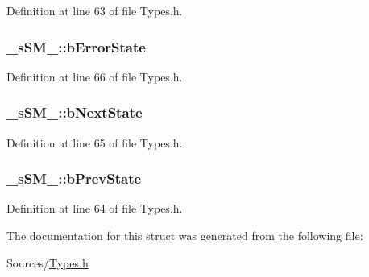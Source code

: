 Definition at line 63 of file Types.\+h.

\subsubsection[{\texorpdfstring{b\+Error\+State}{bErrorState}}]{ \+\_\+s\+S\+M\+\_\+\+::b\+Error\+State}\hypertarget{struct__s_s_m___ae352c7c0e16b2aa7927f3de235c5551a}{}\label{struct__s_s_m___ae352c7c0e16b2aa7927f3de235c5551a}


Definition at line 66 of file Types.\+h.

\subsubsection[{\texorpdfstring{b\+Next\+State}{bNextState}}]{ \+\_\+s\+S\+M\+\_\+\+::b\+Next\+State}\hypertarget{struct__s_s_m___acac983c7a642ce525beef00a38c2bb01}{}\label{struct__s_s_m___acac983c7a642ce525beef00a38c2bb01}


Definition at line 65 of file Types.\+h.

\subsubsection[{\texorpdfstring{b\+Prev\+State}{bPrevState}}]{ \+\_\+s\+S\+M\+\_\+\+::b\+Prev\+State}\hypertarget{struct__s_s_m___ac16c54360c2557d7b811fa9d9789ae37}{}\label{struct__s_s_m___ac16c54360c2557d7b811fa9d9789ae37}


Definition at line 64 of file Types.\+h.



The documentation for this struct was generated from the following file\+:\begin{DoxyCompactItemize}
\item 
Sources/\hyperlink{_types_8h}{Types.\+h}\end{DoxyCompactItemize}
